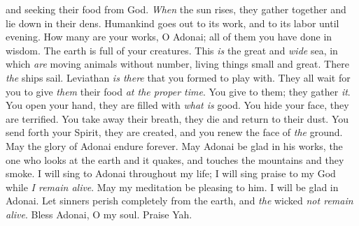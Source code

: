 \begin{biblechapter}
and seeking their food from God.
\verse \textit{When} the sun rises, they gather together 
and lie down in their dens.
\verse Humankind goes out to its work, 
and to its labor until evening.
\verse How many are your works, O Adonai; 
all of them you have done in wisdom. 
The earth is full of your creatures.
\verse This \textit{is} the great and \textit{wide} sea, 
in which \textit{are} moving animals without number, 
living things small and great.
\verse There \textit{the} ships sail. 
Leviathan \textit{is there} that you formed to play with.
\verse They all wait for you 
to give \textit{them} their food \textit{at the proper time}.
\verse You give to them; they gather \textit{it}. 
You open your hand, they are filled with \textit{what is} good.
\verse You hide your face, they are terrified. 
You take away their breath, they die 
and return to their dust.
\verse You send forth your Spirit, they are created, 
and you renew the face of \textit{the} ground.
\verse May the glory of Adonai endure forever. 
May Adonai be glad in his works,
\verse the one who looks at the earth and it quakes, 
and touches the mountains and they smoke.
\verse I will sing to Adonai throughout my life; 
I will sing praise to my God while \textit{I remain alive}.
\verse May my meditation be pleasing to him. 
I will be glad in Adonai.
\verse Let sinners perish completely from the earth, 
and \textit{the} wicked \textit{not remain alive}. 
Bless Adonai, O my soul. 
Praise Yah.
\end{biblechapter}

